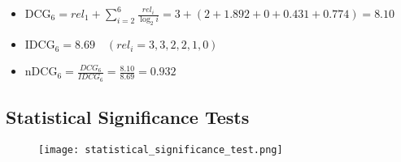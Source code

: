 \begin{itemize}
\item $\mathrm{DCG_6} = rel_{1} + \sum_{i=2}^{6} \frac{rel_{i}}{\log_{2}i} = 3 + (2 + 1.892 + 0 + 0.431 + 0.774) = 8.10$
\item $\mathrm{IDCG_{6}} = 8.69\quad (rel_i = {3,3,2,2,1,0})$
\item $\mathrm{nDCG_{6}} = \frac{DCG_{6}}{IDCG_{6}} = \frac{8.10}{8.69} = 0.932$
\end{itemize}

\subsection{Statistical Significance Tests}
\begin{figure}[H]
    \centering
    \texttt{[image: statistical\_significance\_test.png]}
\end{figure}

